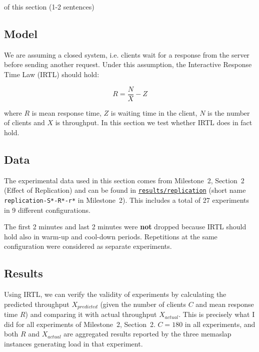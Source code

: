 \documentclass[11pt]{article}
\newcommand{\todo}[1]{\fcolorbox{black}{Apricot}{TODO: #1}}
\begin{document}
\todo{Purpose} of this section (1-2 sentences)

\subsection{Model}

We are assuming a closed system, i.e. clients wait for a response from the server before sending another request. Under this assumption, the Interactive Response Time Law (IRTL) should hold:

$$R = \frac{N}{X} - Z$$

where $R$ is mean response time, $Z$ is waiting time in the client, $N$ is the number of clients and $X$ is throughput. In this section we test whether IRTL does in fact hold.

\subsection{Data}

The experimental data used in this section comes from Milestone~2, Section~2 (Effect of Replication) and can be found in \texttt{\href{https://gitlab.inf.ethz.ch/pungast/asl-fall16-project/tree/master/results/replication}{results/replication}} (short name \texttt{replication-S*-R*-r*} in Milestone~2). This includes a total of 27 experiments in 9 different configurations.

The first 2 minutes and last 2 minutes were \textbf{not} dropped because IRTL should hold also in warm-up and cool-down periods. Repetitions at the same configuration were considered as separate experiments.

\subsection{Results}

Using IRTL, we can verify the validity of experiments by calculating the predicted throughput $X_{predicted}$ (given the number of clients $C$ and mean response time $R$) and comparing it with actual throughput $X_{actual}$. This is precisely what I did for all experiments of Milestone~2, Section~2. $C=180$ in all experiments, and both $R$ and $X_{actual}$ are aggregated results reported by the three memaslap instances generating load in that experiment.
\end{document}
